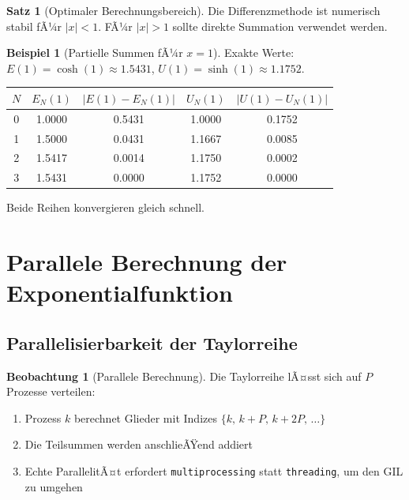 ﻿\documentclass[a4paper,12pt]{article}
\theoremstyle{definition}
\newtheorem{beispiel}{Beispiel}
\newtheorem{satz}{Satz}
\newtheorem{beobachtung}{Beobachtung}
\begin{document}
\begin{satz}[Optimaler Berechnungsbereich]
Die Differenzmethode ist numerisch stabil fÃ¼r $|x| < 1$. FÃ¼r $|x| > 1$
sollte direkte Summation verwendet werden.
\end{satz}

\begin{beispiel}[Partielle Summen fÃ¼r $x=1$]
Exakte Werte: $E(1) = \cosh(1) \approx 1.5431$,
$U(1) = \sinh(1) \approx 1.1752$.

\begin{center}
\begin{tabular}{c|c|c|c|c}
  $N$ & $E_N(1)$ & $|E(1)-E_N(1)|$ & $U_N(1)$ & $|U(1)-U_N(1)|$ \\
  \hline
  0 & 1.0000 & 0.5431 & 1.0000 & 0.1752 \\
  1 & 1.5000 & 0.0431 & 1.1667 & 0.0085 \\
  2 & 1.5417 & 0.0014 & 1.1750 & 0.0002 \\
  3 & 1.5431 & 0.0000 & 1.1752 & 0.0000 \\
\end{tabular}
\end{center}
Beide Reihen konvergieren gleich schnell.
\end{beispiel}

\section{Parallele Berechnung der Exponentialfunktion}

\subsection{Parallelisierbarkeit der Taylorreihe}

\begin{beobachtung}[Parallele Berechnung]
Die Taylorreihe lÃ¤sst sich auf $P$ Prozesse verteilen:
\begin{enumerate}
  \item Prozess $k$ berechnet Glieder mit Indizes
        $\{k,\, k+P,\, k+2P,\, \ldots\}$
  \item Die Teilsummen werden anschlieÃŸend addiert
  \item Echte ParallelitÃ¤t erfordert \texttt{multiprocessing} statt
        \texttt{threading}, um den GIL zu umgehen
\end{enumerate}
\end{beobachtung}
\end{document}
